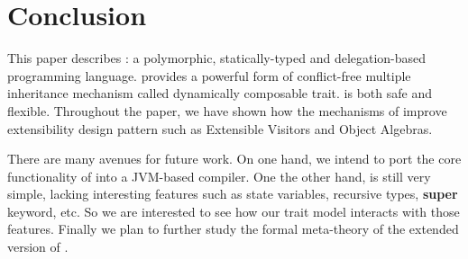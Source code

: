 \section{Conclusion}

This paper describes \name: a polymorphic, statically-typed and delegation-based
programming language. \name provides a powerful form of conflict-free multiple
inheritance mechanism called dynamically composable trait. \name is both safe
and flexible. Throughout the paper, we have shown how the mechanisms of \name
improve extensibility design pattern such as Extensible Visitors and Object
Algebras.

There are many avenues for future work. On one hand, we intend to port the core
functionality of \name into a JVM-based compiler. One the other hand, \name is
still very simple, lacking interesting features such as state variables,
recursive types, \textbf{super} keyword, etc. So we are interested to see how
our trait model interacts with those features. Finally we plan to further study
the formal meta-theory of the extended version of \bname.
